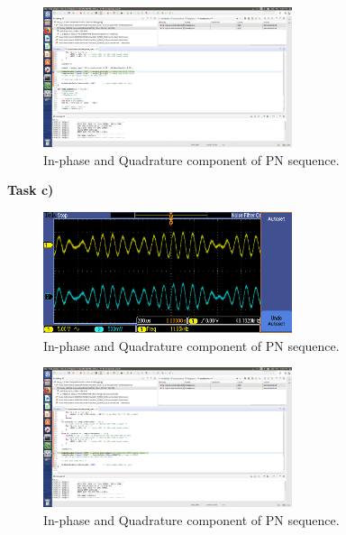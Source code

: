 \documentclass{article}
\begin{document}
\begin{figure}[h]
  \begin{center}
    \includegraphics[width=0.65\textwidth]{img/task_b_profile.png}
    \caption{In-phase and Quadrature component of PN sequence.}
  \end{center}
\end{figure}

\pagebreak
\textbf{Task c)}

\begin{figure}[h]
  \begin{center}
    \includegraphics[width=0.65\textwidth]{img/task_c_oscilloscope.png}
    \caption{In-phase and Quadrature component of PN sequence.}
  \end{center}
\end{figure}

\begin{figure}[h]
  \begin{center}
    \includegraphics[width=0.65\textwidth]{img/task_c_profile.png}
    \caption{In-phase and Quadrature component of PN sequence.}
  \end{center}
\end{figure}
\end{document}
